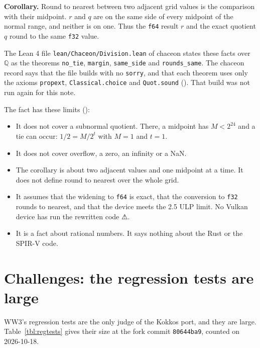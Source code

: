 \documentclass[10pt,a4paper,]{article}
\providecommand{\tightlist}{\setlength{\itemsep}{0pt}\setlength{\parskip}{0pt}}
\begin{document}
\textbf{Corollary.} Round to nearest between two adjacent grid values is
the comparison with their midpoint. \(r\) and \(q\) are on the same side
of every midpoint of the normal range, and neither is on one. Thus the
\texttt{f64} result \(r\) and the exact quotient \(q\) round to the same
\texttt{f32} value.

The Lean 4 file \texttt{lean/Chaceon/Division.lean} of chaceon states
these facts over \(\mathbb{Q}\) as the theorems \texttt{no\_tie},
\texttt{margin}, \texttt{same\_side} and \texttt{rounds\_same}. The
chaceon record says that the file builds with no \texttt{sorry}, and
that each theorem uses only the axioms \texttt{propext},
\texttt{Classical.choice} and \texttt{Quot.sound}
(). That build was not run
again for this note.

The fact has these limits ():

\begin{itemize}
\tightlist
\item
  It does not cover a subnormal quotient. There, a midpoint has
  \(M < 2^{24}\) and a tie can occur: \(1/2 = M/2^{t}\) with \(M = 1\)
  and \(t = 1\).
\item
  It does not cover overflow, a zero, an infinity or a NaN.
\item
  The corollary is about two adjacent values and one midpoint at a time.
  It does not define round to nearest over the whole grid.
\item
  It assumes that the widening to \texttt{f64} is exact, that the
  conversion to \texttt{f32} rounds to nearest, and that the device
  meets the 2.5 ULP limit. No Vulkan device has run the rewritten code
  ⚠.
\item
  It is a fact about rational numbers. It says nothing about the Rust or
  the SPIR-V code.
\end{itemize}

\section{Challenges: the regression tests are
large}\label{sec:challenges}

WW3's regression tests are the only judge of the Kokkos port, and they
are large. Table~\ref{tbl:regtests} gives their size at the fork commit
\texttt{80644ba9}, counted on 2026-10-18.
\end{document}
